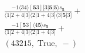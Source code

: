 \documentclass[varwidth, border=5pt]{standalone}
\begin{document}
\begin{my}
$\begin{gathered}
\scriptscriptstyle\frac{-1⟨34⟩[𝟓3][3|𝟓|𝟓⟩s_{𝟓}}{⟨1|2+4|3]⟨2|1+4|3]⟨3|𝟓|3]} +\\
\scriptscriptstyle\frac{-1[𝟓3]⟨4𝟓⟩s_{𝟓}}{⟨1|2+4|3]⟨2|1+4|3]} +\\
\scriptscriptstyle(43215,\;\text{True},\;-) \phantom{+}
\end{gathered}$
\end{my}
\end{document}
